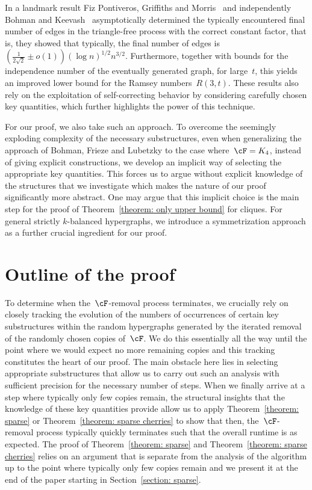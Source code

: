 \documentclass[11pt]{amsart}
\theoremstyle{definition}
\numberwithin{equation}{section}
\begin{document}
	In a landmark result Fiz Pontiveros, Griffiths and Morris~\cite{PGM:20} and independently Bohman and Keevash~\cite{BK:21} asymptotically determined the typically encountered final number of edges in the triangle-free process with the correct constant factor, that is, they showed that typically, the final number of edges is~$(\frac{1}{2\sqrt{2}}\pm o(1))(\log n)^{1/2}n^{3/2}$.
	Furthermore, together with bounds for the independence number of the eventually generated graph, for large~$t$, this yields an improved lower bound for the Ramsey numbers~$R(3,t)$.
	These results also rely on the exploitation of self-correcting behavior by considering carefully chosen key quantities, which further highlights the power of this technique.
	
	For our proof, we also take such an approach.
	To overcome the seemingly exploding complexity of the necessary substructures, even when generalizing the approach of Bohman, Frieze and Lubetzky to the case where~$\cF=K_4$, instead of giving explicit constructions, we develop an implicit way of selecting the appropriate key quantities.
	This forces us to argue without explicit knowledge of the structures that we investigate which makes the nature of our proof significantly more abstract.
	One may argue that this implicit choice is the main step for the proof of Theorem~\ref{theorem: only upper bound} for cliques.
	For general strictly $k$-balanced hypergraphs, we introduce a symmetrization approach as a further crucial ingredient for our proof.


	
	
	\section{Outline of the proof}\label{section: outline}
	
	
	To determine when the~$\cF$-removal process terminates, we crucially rely on closely tracking the evolution of the numbers of occurrences of certain key substructures within the random hypergraphs generated by the iterated removal of the randomly chosen copies of~$\cF$.
	We do this essentially all the way until the point where we would expect no more remaining copies and this tracking constitutes the heart of our proof.
	The main obstacle here lies in selecting appropriate substructures that allow us to carry out such an analysis with sufficient precision for the necessary number of steps.
	When we finally arrive at a step where typically only few copies remain, the structural insights that the knowledge of these key quantities provide allow us to apply Theorem~\ref{theorem: sparse} or Theorem~\ref{theorem: sparse cherries} to show that then, the~$\cF$-removal process typically quickly terminates such that the overall runtime is as expected.
	The proof of Theorem~\ref{theorem: sparse} and Theorem~\ref{theorem: sparse cherries} relies on an argument that is separate from the analysis of the algorithm up to the point where typically only few copies remain and we present it at the end of the paper starting in Section~\ref{section: sparse}.
	
\end{document}
